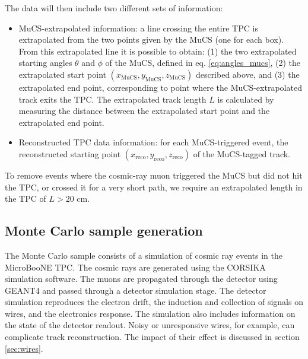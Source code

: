 \documentclass[a4paper,11pt]{article}
\begin{document}
The data will then include two different sets of information:
\begin{itemize}
  \item MuCS-extrapolated information: a line crossing the entire TPC is extrapolated from the two points given by the MuCS (one for each box). From this extrapolated line it is possible to obtain: (1) the two extrapolated starting angles $\theta$ and $\phi$ of the MuCS, defined in eq. \eqref{eq:angles_mucs}, (2) the extrapolated start point $(x_{\mathrm{MuCS}},y_{\mathrm{MuCS}},z_{\mathrm{MuCS}})$ described above, and (3) the extrapolated end point, corresponding to point where the MuCS-extrapolated track exits the TPC. The extrapolated track length $L$ is calculated by measuring the distance between the extrapolated start point and the extrapolated end point.
  \item Reconstructed TPC data information: for each MuCS-triggered event, the reconstructed starting point $(x_{\mathrm{reco}},y_{\mathrm{reco}},z_{\mathrm{reco}})$ of the MuCS-tagged track.
\end{itemize}
To remove events where the cosmic-ray muon triggered the MuCS but did not hit the TPC, or crossed it for a very short path, we require an extrapolated length in the TPC of $L > 20$ cm.

\subsection{Monte Carlo sample generation}\label{sec:mcgen}

The Monte Carlo sample consists of a simulation of cosmic ray events in the MicroBooNE TPC. The cosmic rays are generated using the CORSIKA \cite{corsika} simulation software. The muons are propagated through the detector using GEANT4 \cite{geant} and passed through a detector simulation stage. The detector simulation reproduces the electron drift, the induction and collection of signals on wires, and the electronics response. The simulation also includes information on the state of the detector readout. Noisy or unresponsive wires, for example, can complicate track reconstruction. The impact of their effect is discussed in section \ref{sec:wires}.
\end{document}
